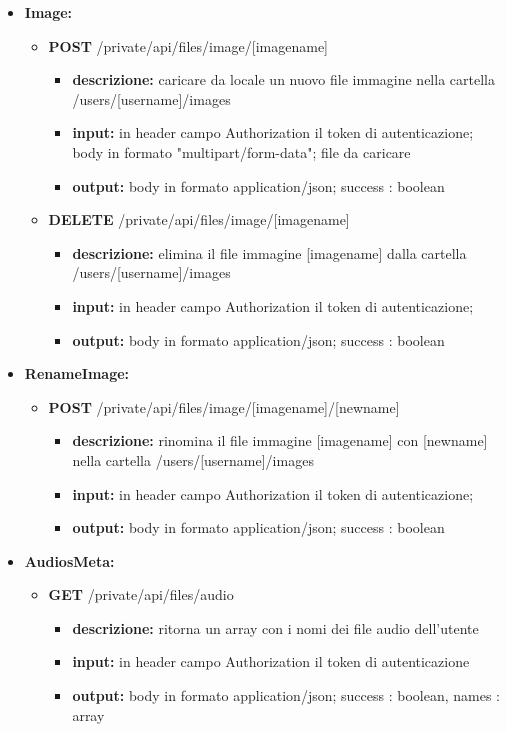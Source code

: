 {{\begin{itemize}
		\item \textbf{Image:}
			\begin{itemize}
			\item    \textbf{POST} /private/api/files/image/[imagename]
				\begin{itemize} 
				\item \textbf{descrizione:} caricare da locale un nuovo file immagine nella cartella /users/[username]/images					
				\item \textbf{input:} in header campo Authorization il token di autenticazione; body in formato "multipart/form-data"; file da caricare
				\item \textbf{output:} body in formato application/json; success : boolean
				\end{itemize}
			\item   \textbf{DELETE} /private/api/files/image/[imagename]
				\begin{itemize} 
				\item \textbf{descrizione:} elimina il file immagine [imagename] dalla cartella /users/[username]/images			
				\item \textbf{input:} in header campo Authorization il token di autenticazione;
				\item \textbf{output:} body in formato application/json; success : boolean
				\end{itemize}
			\end{itemize}
			
		\item \textbf{RenameImage:}
			\begin{itemize}
			\item   \textbf{POST} /private/api/files/image/[imagename]/[newname] 
				\begin{itemize} 
				\item \textbf{descrizione:} rinomina il file immagine [imagename] con [newname] nella cartella /users/[username]/images
				\item \textbf{input:} in header campo Authorization il token di autenticazione;
				\item \textbf{output:} body in formato application/json; success : boolean
				\end{itemize}
			\end{itemize}
			
		\item \textbf{AudiosMeta:}
			\begin{itemize}
			\item   \textbf{GET} /private/api/files/audio
				\begin{itemize} 
				\item \textbf{descrizione:} ritorna un array con i nomi dei file audio dell'utente
				\item \textbf{input:} in header campo Authorization il token di autenticazione
				\item \textbf{output:} body in formato application/json; success : boolean, names : array
				\end{itemize}
			\end{itemize}
			

\end{itemize}}}
